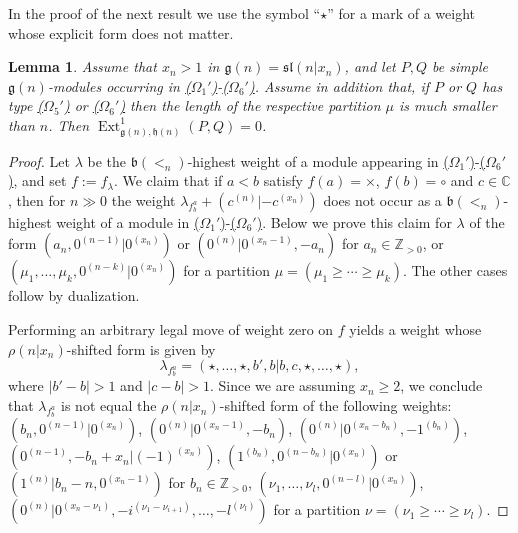 \documentclass[12pt]{amsart}
\newcommand\C{\mathbb{C}}
\newcommand\Z{\mathbb{Z}}
\newcommand\g{\mathfrak{g}}
\newcommand\fh{\mathfrak{h}}
\newcommand\fb{\mathfrak{b}}
\newcommand\fsl{\mathfrak{sl}}
\DeclareMathOperator{\Ext}{Ext}
\theoremstyle{plain}
\newtheorem{lem}[theo]{Lemma}
\theoremstyle{definition}
\numberwithin{equation}{section}
\begin{document}
In the proof of the next result we use the symbol ``$\star$'' for a mark of a weight whose explicit form does not matter.

	
\begin{lem}\label{lem:not.hw.trivial.ext}
Assume that $x_n>1$ in $\g(n) = \fsl(n | x_n)$, and let $P, Q$ be simple $\g(n)$-modules occurring in {\rm \hyperref[sym.type.mod]{($\Omega_1'$)}-\hyperref[partition.type.mod.dual]{($\Omega_6'$)}}. Assume in addition that, if $P$ or $Q$ has type {\rm \hyperref[partition.type.mod]{($\Omega_5'$)}} or {\rm  \hyperref[partition.type.mod.dual]{($\Omega_6'$)}} then the length of the respective partition $\mu$ is much smaller than $n$. Then $\Ext_{\g(n), \fh(n)}^1(P,Q)=0$.
\end{lem}
\begin{proof}
Let $\lambda$ be the $\fb(<_n)$-highest weight of a module appearing in {\rm \hyperref[sym.type.mod]{($\Omega_1'$)}-\hyperref[partition.type.mod.dual]{($\Omega_6'$)}}, and set $f:=f_{\lambda}$. We claim that if $a<b$ satisfy $f(a) = \times$, $f(b) = \circ$ and $c\in \C$, then for $n\gg 0$ the weight $\lambda_{f_b^a}+(c^{(n)}|-c^{(x_n)})$ does not occur as a $\fb(<_n)$-highest weight of a module  in {\rm \hyperref[sym.type.mod]{($\Omega_1'$)}-\hyperref[partition.type.mod.dual]{($\Omega_6'$)}}. Below we prove this claim for $\lambda$ of the form $(a_n, 0^{(n-1)} | 0^{(x_n)})$ or $(0^{(n)} | 0^{(x_n-1)}, -a_n)$ for $a_n \in \Z_{>0}$, or $(\mu_1,\ldots, \mu_k, 0^{(n-k)} | 0^{(x_n)})$ for a partition $\mu = (\mu_1\geq \cdots \geq \mu_k)$. The other cases follow by dualization.

Performing an arbitrary legal move of weight zero on $f$ yields a weight whose $\rho(n|x_n)$-shifted form is given by
	\[
\lambda_{f^a_b} = (\star, \ldots, \star,b', b | b, c, \star, \ldots, \star),
	\]
where $|b' - b|>1$ and $|c-b|>1$. Since we are assuming $x_n\geq 2$, we conclude that $\lambda_{f^a_b}$ is not equal the $\rho(n|x_n)$-shifted form of the following weights: $(b_n, 0^{(n-1)} | 0^{(x_n)})$, $(0^{(n)} | 0^{(x_n-1)}, -b_n)$, $(0^{(n)}|0^{(x_n-b_n)}, -1^{(b_n)})$, $(0^{(n-1)}, -b_n + x_n| (-1)^{(x_n)})$, $(1^{(b_n)},0^{(n-b_n)}|0^{(x_n)})$ or $(1^{(n)}|b_n-n, 0^{(x_n-1)})$ for $b_n\in \Z_{>0}$, $(\nu_1,\ldots, \nu_l, 0^{(n-l)} | 0^{(x_n)})$, $(0^{(n)}|0^{(x_n-\nu_1)},-i^{(\nu_1 - \nu_{i+1})},\ldots,-l^{(\nu_l)})$ for a partition $\nu = (\nu_1\geq \cdots \geq \nu_l)$.


\end{proof}
\end{document}
